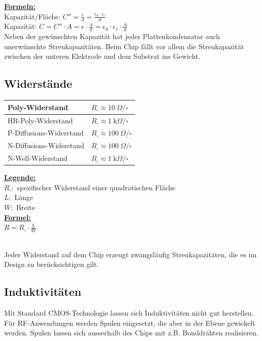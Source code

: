\begin{minipage}[c]{0.55\textwidth}
	\uline{\textbf{Formeln:}}\\
	Kapazität/Fläche: $C'' = \frac{\epsilon}{d} = \frac{\epsilon_0 \cdot \epsilon_r}{d}$\\
	Kapazität: \hspace{11.5mm}$C = C'' \cdot A = \epsilon\cdot\frac{A}{d}=\epsilon_0\cdot\epsilon_r\cdot\frac{A}{d}$ \\
	Neben der gewünschten Kapazität hat jeder Plattenkondensator auch unerwünschte Streukapazitäten. 
	Beim Chip fällt vor allem die Streukapazität zwischen der unteren Elektrode und dem Substrat ins Gewicht.
\end{minipage}

\subsection{Widerstände}
\begin{minipage}[c]{0.45\textwidth}
	\begin{tabular}{|l|l|}
		\hline
		Poly-Widerstand & $R_\square \approx \SI{10}{\Omega \per}\square$\\ \hline
		HR-Poly-Widerstand & $R_\square \approx \SI{1}{\kilo\Omega \per}\square$\\ \hline
		P-Diffusions-Widerstand & $R_\square \approx \SI{100}{\Omega \per}\square$\\ \hline
		N-Diffusions-Widerstand & $R_\square \approx \SI{100}{\Omega \per}\square$\\ \hline
		N-Well-Widerstand & $R_\square \approx \SI{1}{\kilo\Omega \per}\square$\\ \hline
	\end{tabular}
\end{minipage}
\begin{minipage}[c]{0.55\textwidth}
	\uline{\textbf{Legende:}}\\
	$R_\square:$ spezifischer Widerstand einer quadratischen Fläche\\
	$L:$ Länge \\
	$W:$ Breite \\
	\uline{\textbf{Formel:}}\\
	$R = R_\square \cdot \frac{L}{W}$
\end{minipage}
\\[1ex]
Jeder Widerstand auf dem Chip erzeugt zwangsläufig Streukapazitäten, die es im Design zu berücksichtigen gilt.

\subsection{Induktivitäten}
Mit Standard CMOS-Technologie lassen sich Induktivitäten nicht gut herstellen.
Für RF-Anwendungen werden Spulen eingesetzt, die aber in der Ebene gewickelt werden.
Spulen lassen sich ausserhalb des Chips mit z.B. Bonddrähten realisieren.